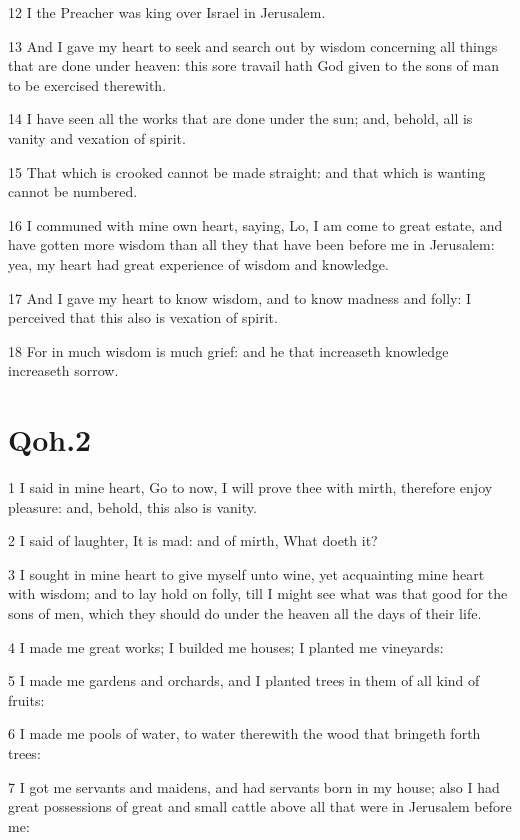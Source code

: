 \documentclass[12pt]{report}
\begin{document}
12 I the Preacher was king over Israel in Jerusalem.
   
13 And I gave my heart to seek and search out by wisdom
   concerning
   all things that are done under heaven: this sore travail hath God
   given to the sons of man to be exercised therewith.
   
14 I have seen all the works that are done under the sun; and,
   behold, all is vanity and vexation of spirit.
   
15 That which is crooked cannot be made straight: and that which
   is
   wanting cannot be numbered.
   
16 I communed with mine own heart, saying, Lo, I am come to great
   estate, and have gotten more wisdom than all they that have been
   before me in Jerusalem: yea, my heart had great experience of
   wisdom
   and knowledge.
   
17 And I gave my heart to know wisdom, and to know madness and
   folly: I perceived that this also is vexation of spirit.
   
18 For in much wisdom is much grief: and he that increaseth
   knowledge increaseth sorrow.

\section{Qoh.2}
   
   
1 I said in mine heart, Go to now, I will prove thee with mirth,
   therefore enjoy pleasure: and, behold, this also is vanity.
   
2 I said of laughter, It is mad: and of mirth, What doeth it?
   
3 I sought in mine heart to give myself unto wine, yet
   acquainting
   mine heart with wisdom; and to lay hold on folly, till I might see
   what was that good for the sons of men, which they should do under
   the
   heaven all the days of their life.
   
4 I made me great works; I builded me houses; I planted me
   vineyards:
   
5 I made me gardens and orchards, and I planted trees in them of
   all
   kind of fruits:
   
6 I made me pools of water, to water therewith the wood that
   bringeth forth trees:
   
7 I got me servants and maidens, and had servants born in my
   house;
   also I had great possessions of great and small cattle above all
   that
   were in Jerusalem before me:
   
\end{document}
